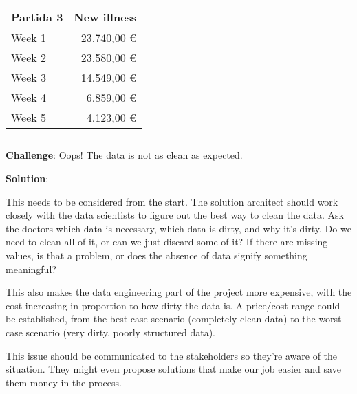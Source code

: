 \begin{center}
    \begin{tabular}{|l|r|}
        \hline
        \toprule
        \textbf{Partida 3} & \textbf{New illness} \\ \hline
        \midrule
        Week 1             & 23.740,00 \euro      \\ \hline
        Week 2             & 23.580,00 \euro      \\  \hline
        Week 3             & 14.549,00 \euro      \\ \hline
        Week 4             & 6.859,00 \euro       \\ \hline
        Week 5             & 4.123,00 \euro       \\ \hline
        \bottomrule
    \end{tabular}
\end{center}

\subsection*{}
\begin{warning}
    \textbf{Challenge}: Oops!
    The data is not as clean as expected.

    \textbf{Solution}:

    This needs to be considered from the start.
    The solution architect should work closely with the data scientists to figure out the best way to clean the data.
    Ask the doctors which data is necessary, which data is dirty, and why it’s dirty.
    Do we need to clean all of it, or can we just discard some of it?
    If there are missing values, is that a problem, or does the absence of data signify something meaningful?

    This also makes the data engineering part of the project more expensive, with the cost increasing in proportion to how dirty the data is.
    A price/cost range could be established, from the best-case scenario (completely clean data) to the worst-case scenario (very dirty, poorly structured data).

    This issue should be communicated to the stakeholders so they’re aware of the situation.
    They might even propose solutions that make our job easier and save them money in the process.


\end{warning}